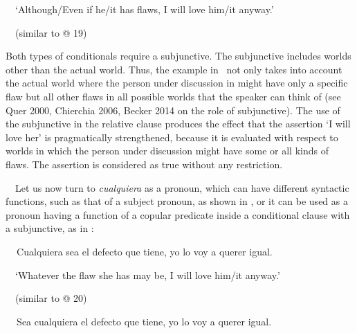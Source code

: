 \begin{styleStandard}
\ \ ‘Although/Even if he/it has flaws, I will love him/it anyway.’
\end{styleStandard}

\begin{styleStandard}
\ \ (similar to @ 19)
\end{styleStandard}

\begin{styleStandard}
Both types of conditionals require a subjunctive. The subjunctive includes worlds other than the actual world. Thus, the example in \ not only takes into account the actual world where the person under discussion in might have only a specific flaw but all other flaws in all possible worlds that the speaker can think of (see Quer 2000, Chierchia 2006, Becker 2014 on the role of subjunctive). The use of the subjunctive in the relative clause produces the effect that the assertion ‘I will love her’ is pragmatically strengthened, because it is evaluated with respect to worlds in which the person under discussion might have some or all kinds of flaws. The assertion is considered as true without any restriction. 
\end{styleStandard}

\begin{styleStandard}
\ \ Let us now turn to \textit{cualquiera} as a pronoun, which can have different syntactic functions, such as that of a subject pronoun, as shown in , or it can be used as a pronoun having a function of a copular predicate inside a conditional clause with a subjunctive, as in :
\end{styleStandard}

\begin{styleStandard}
\label{bkm:Ref533761017}\textbf{\ \ }Cualquiera sea el defecto que tiene, yo lo voy a querer igual.
\end{styleStandard}

\begin{styleStandard}
\ \ ‘Whatever the flaw she has may be, I will love him/it anyway.’
\end{styleStandard}

\begin{styleStandard}
\ \ (similar to @ 20)
\end{styleStandard}

\begin{styleStandard}
\label{bkm:Ref533761034}\textbf{\ \ }Sea cualquiera el defecto que tiene, yo lo voy a querer igual.
\end{styleStandard}


